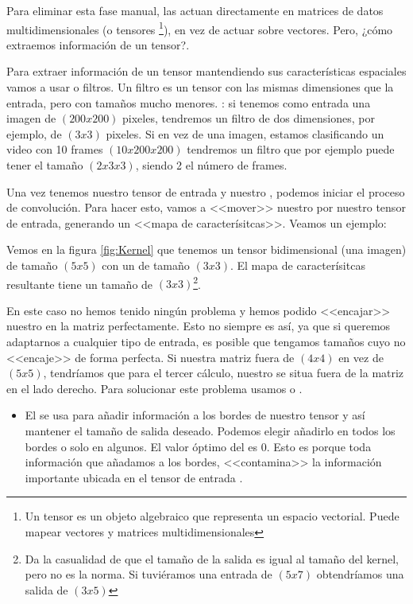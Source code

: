 \begin{itemize}
\begin{enumerate}
                Para eliminar esta fase manual, las  actuan directamente en matrices de datos multidimensionales (o tensores \footnote{Un tensor es un objeto algebraico que representa un espacio vectorial. Puede mapear vectores y matrices multidimensionales }), en vez de actuar sobre vectores. Pero, ¿cómo extraemos información de un tensor?.

                Para extraer información de un tensor mantendiendo sus características espaciales vamos a usar  o filtros. Un filtro es un tensor con las mismas dimensiones que la entrada, pero con tamaños mucho menores. \pe: si tenemos como entrada una imagen de $(200x200)$ pixeles, tendremos un filtro de dos dimensiones, por ejemplo, de $(3x3)$ pixeles. Si en vez de una imagen, estamos clasificando un video con 10 frames $(10x200x200)$ tendremos un filtro que por ejemplo puede tener el tamaño $(2x3x3)$, siendo 2 el número de frames.

                Una vez tenemos nuestro tensor de entrada y nuestro , podemos iniciar el proceso de convolución. Para hacer esto, vamos a <<mover>> nuestro  por nuestro tensor de entrada, generando un <<mapa de caracterísitcas>>. Veamos un ejemplo:


                Vemos en la figura \ref{fig:Kernel} que tenemos un tensor bidimensional (\pe una imagen) de tamaño $(5x5)$ con un  de tamaño $(3x3)$. El mapa de caracterísitcas resultante tiene un tamaño de $(3x3)$\footnote{Da la casualidad de que el tamaño de la salida es igual al tamaño del kernel, pero no es la norma. Si tuviéramos una entrada de $(5x7)$ obtendríamos una salida de $(3x5)$}.

                En este caso no hemos tenido ningún problema y hemos podido <<encajar>> nuestro  en la matriz perfectamente. Esto no siempre es así, ya que si queremos adaptarnos a cualquier tipo de entrada, es posible que tengamos tamaños cuyo  no <<encaje>> de forma perfecta. Si nuestra matriz fuera de $(4x4)$ en vez de $(5x5)$, tendríamos que para el tercer cálculo, nuestro  se situa fuera de la matriz en el lado derecho. Para solucionar este problema usamos  o .

                \begin{itemize}
                  \item El  se usa para añadir información a los bordes de nuestro tensor y así mantener el tamaño de salida deseado. Podemos elegir añadirlo en todos los bordes o solo en algunos. El valor óptimo del  es $0$. Esto es porque toda información que añadamos a los bordes, <<contamina>> la información importante ubicada en el tensor de entrada .


\end{itemize}
\end{enumerate}
\end{itemize}
